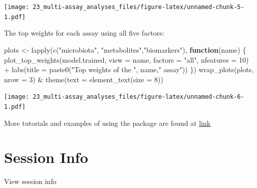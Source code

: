 \documentclass[
]{book}
\newenvironment{Shaded}{\begin{snugshade}}{\end{snugshade}}
\newcommand{\AttributeTok}[1]{\textcolor[rgb]{0.77,0.63,0.00}{#1}}
\newcommand{\ControlFlowTok}[1]{\textcolor[rgb]{0.13,0.29,0.53}{\textbf{#1}}}
\newcommand{\DecValTok}[1]{\textcolor[rgb]{0.00,0.00,0.81}{#1}}
\newcommand{\FunctionTok}[1]{\textcolor[rgb]{0.00,0.00,0.00}{#1}}
\newcommand{\NormalTok}[1]{#1}
\newcommand{\OtherTok}[1]{\textcolor[rgb]{0.56,0.35,0.01}{#1}}
\newcommand{\SpecialCharTok}[1]{\textcolor[rgb]{0.00,0.00,0.00}{#1}}
\newcommand{\StringTok}[1]{\textcolor[rgb]{0.31,0.60,0.02}{#1}}
\begin{document}
\texttt{[image: 23\_multi-assay\_analyses\_files/figure-latex/unnamed-chunk-5-1.pdf]}

The top weights for each assay using all five factors:

\begin{Shaded}
\begin{Highlighting}[]
\NormalTok{plots }\OtherTok{\textless{}{-}} \FunctionTok{lapply}\NormalTok{(}\FunctionTok{c}\NormalTok{(}\StringTok{"microbiota"}\NormalTok{, }\StringTok{"metabolites"}\NormalTok{,}\StringTok{"biomarkers"}\NormalTok{), }\ControlFlowTok{function}\NormalTok{(name) \{}
    \FunctionTok{plot\_top\_weights}\NormalTok{(model.trained,}
                     \AttributeTok{view =}\NormalTok{ name,}
                     \AttributeTok{factors =} \StringTok{"all"}\NormalTok{,}
                     \AttributeTok{nfeatures =} \DecValTok{10}\NormalTok{) }\SpecialCharTok{+}
        \FunctionTok{labs}\NormalTok{(}\AttributeTok{title =} \FunctionTok{paste0}\NormalTok{(}\StringTok{"Top weights of the "}\NormalTok{, name,}\StringTok{" assay"}\NormalTok{))}
\NormalTok{\})}
\FunctionTok{wrap\_plots}\NormalTok{(plots, }\AttributeTok{nrow =} \DecValTok{3}\NormalTok{) }\SpecialCharTok{\&} \FunctionTok{theme}\NormalTok{(}\AttributeTok{text =} \FunctionTok{element\_text}\NormalTok{(}\AttributeTok{size =} \DecValTok{8}\NormalTok{))}
\end{Highlighting}
\end{Shaded}

\texttt{[image: 23\_multi-assay\_analyses\_files/figure-latex/unnamed-chunk-6-1.pdf]}

More tutorials and examples of using the package are found at \href{https://biofam.github.io/MOFA2/tutorials.html}{link}

\hypertarget{session-info-9}{%
\section*{Session Info}\label{session-info-9}}

View session info
\end{document}

